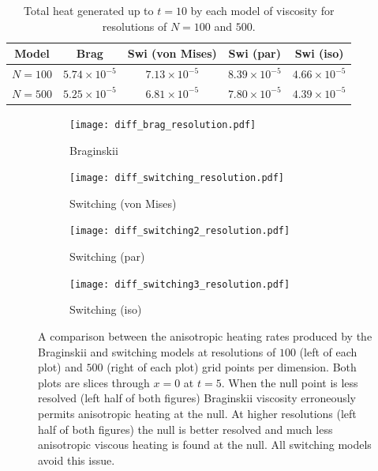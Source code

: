 \begin{table}[t]
  \centering
  \caption{Total heat generated up to $t=10$ by each model of viscosity for resolutions of $N=100$ and $500$.}
  \label{tab:slow_null_results_resolution}
  \begin{tabular}{c|cccc}
Model &  Brag & Swi (von Mises) & Swi (par) & Swi (iso)\\
\midrule
$N=100$ &  $5.74 \times 10^{-5}$ & $7.13 \times 10^{-5}$ & $8.39 \times 10^{-5}$ & $4.66 \times 10^{-5}$\\
$N=500$   & $5.25 \times 10^{-5}$ & $6.81 \times 10^{-5}$ & $7.80 \times 10^{-5}$ & $4.39 \times 10^{-5}$  \end{tabular}
\end{table}

\begin{figure}[t]
    \hfill
    \begin{subfigure}{0.49\textwidth}
      \centering
      \texttt{[image: diff\_brag\_resolution.pdf]}
      \caption{Braginskii}%
      \label{fig:diff_brag_resolution}
    \end{subfigure}
    \hfill
    \begin{subfigure}{0.49\textwidth}
      \texttt{[image: diff\_switching\_resolution.pdf]}
      \caption{Switching (von Mises)}%
      \label{fig:diff_switching_resolution}
    \end{subfigure}
    \hfill
    \begin{subfigure}{0.49\textwidth}
      \texttt{[image: diff\_switching2\_resolution.pdf]}
      \caption{Switching (par)}%
      \label{fig:diff_switching2_resolution}
    \end{subfigure}
    \hfill
    \begin{subfigure}{0.49\textwidth}
      \texttt{[image: diff\_switching3\_resolution.pdf]}
      \caption{Switching (iso)}%
      \label{fig:diff_switching3_resolution}
    \end{subfigure}

    \caption{A comparison between the anisotropic heating rates produced by the Braginskii and switching models at resolutions of $100$ (left of each plot) and $500$ (right of each plot) grid points per dimension. Both plots are slices through $x=0$ at $t=5$. When the null point is less resolved (left half of both figures) Braginskii viscosity erroneously permits anisotropic heating at the null. At higher resolutions (left half of both figures) the null is better resolved and much less anisotropic viscous heating is found at the null. All switching models avoid this issue.}
\label{fig:anisotropy_bleeding}%
\end{figure}

